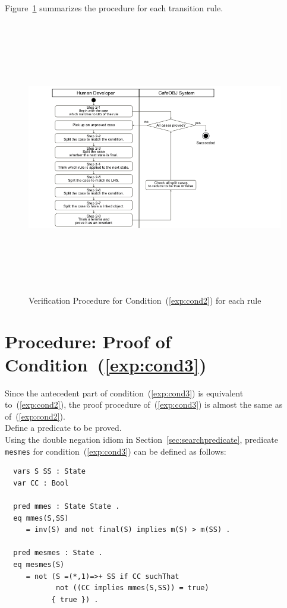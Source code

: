 \documentclass[12pt]{report}
\begin{document}
Figure~\ref{fig:procedure2} summarizes the procedure for each transition rule.
\begin{figure}
\centering
\includegraphics[height=12cm,natwidth=720,natheight=405,clip,trim=60 0 180 0]{procedure2.png}
\caption{Verification Procedure for Condition~(\ref{exp:cond2}) for each rule}
\label{fig:procedure2}
\end{figure}

\section{Procedure: Proof of Condition~(\ref{exp:cond3})}
\label{sec:mesmes}
Since the antecedent part of condition~(\ref{exp:cond3}) is equivalent
to~(\ref{exp:cond2}), the proof procedure of~(\ref{exp:cond3}) is
almost the same as of~(\ref{exp:cond2}). \\

 Define a predicate to be proved.\\ Using the
double negation idiom in Section~\ref{sec:searchpredicate}, predicate
{\tt mesmes} for condition~(\ref{exp:cond3}) can be defined as follows:
\begin{verbatim}
  vars S SS : State
  var CC : Bool

  pred mmes : State State .
  eq mmes(S,SS)
     = inv(S) and not final(S) implies m(S) > m(SS) .

  pred mesmes : State .
  eq mesmes(S)
     = not (S =(*,1)=>+ SS if CC suchThat
            not ((CC implies mmes(S,SS)) = true)
     	   { true }) .
\end{verbatim}
\end{document}
